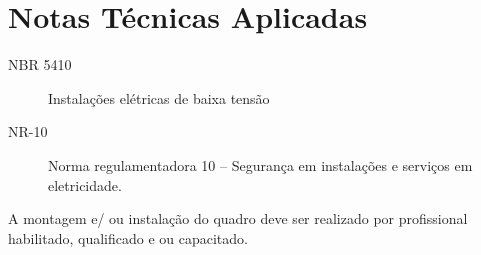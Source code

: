 \section{Notas Técnicas Aplicadas}
\begin{description}
\item[NBR 5410] Instalações elétricas de baixa tensão
\item[NR-10] Norma regulamentadora 10 – Segurança em instalações e serviços em eletricidade.
\end{description}

A montagem e/ ou instalação do quadro deve ser realizado por profissional habilitado, qualificado e ou capacitado. 